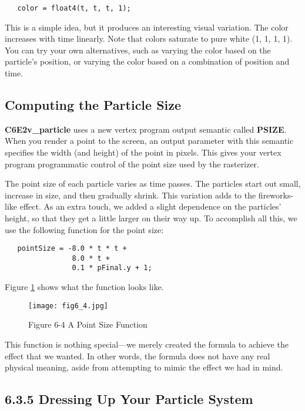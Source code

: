 \documentclass[../main.tex]{subfiles}
\begin{document}
\FloatBarrier
\begin{lstlisting}
   color = float4(t, t, t, 1);
\end{lstlisting}
\FloatBarrier
   
This is a simple idea, but it produces an interesting visual variation. The color increases with time linearly. Note that colors saturate to pure white (1, 1, 1, 1). You can try your own alternatives, such as varying the color based on the particle's position, or varying the color based on a combination of position and time.

\subsection*{Computing the Particle Size}

\textbf{C6E2v_particle} uses a new vertex program output semantic called \textbf{PSIZE}. When you render a point to the screen, an output parameter with this semantic specifies the width (and height) of the point in pixels. This gives your vertex program programmatic control of the point size used by the rasterizer.

The point size of each particle varies as time passes. The particles start out small, increase in size, and then gradually shrink. This variation adds to the fireworks-like effect. As an extra touch, we added a slight dependence on the particles' height, so that they get a little larger on their way up. To accomplish all this, we use the following function for the point size:

\FloatBarrier
\begin{lstlisting}
   pointSize = -8.0 * t * t +
                8.0 * t +
                0.1 * pFinal.y + 1;
\end{lstlisting}
\FloatBarrier
                
Figure \ref{fig:6-4} shows what the function looks like.

\begin{figure}
    \centering
    \texttt{[image: fig6\_4.jpg]}
    \caption{Figure 6-4 A Point Size Function}
    \label{fig:6-4}
\end{figure}

This function is nothing special—we merely created the formula to achieve the effect that we wanted. In other words, the formula does not have any real physical meaning, aside from attempting to mimic the effect we had in mind.

\subsection{6.3.5 Dressing Up Your Particle System}
\end{document}
